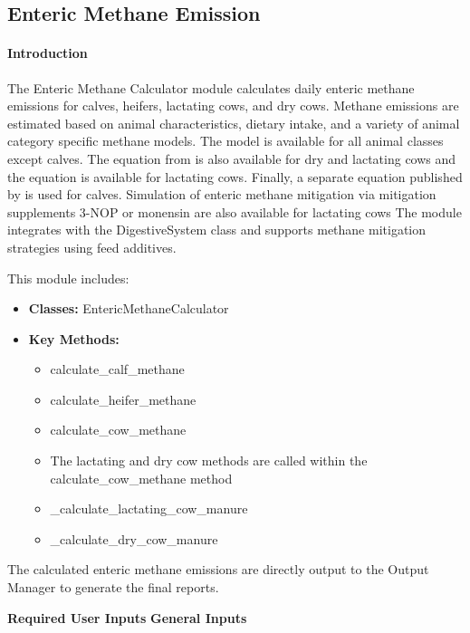 \begin{refsection}
\subsection{Enteric Methane Emission}
 
    \paragraph{Introduction}
    The Enteric Methane Calculator module calculates daily enteric methane emissions for calves, heifers, lactating cows, and dry cows. Methane emissions are estimated based on animal characteristics, dietary intake, and a variety of animal category specific methane models. The \cite{IPCC2006} model is available for all animal classes except calves. The equation from \cite{Mills2003} is also available for dry and lactating cows and the \cite{Niu2018} equation is available for lactating cows. Finally, a separate equation published by \cite{Pattanaik2003} is used for calves. Simulation of enteric methane mitigation via mitigation supplements 3-NOP or monensin are also available for lactating cows The module integrates with the DigestiveSystem class and supports methane mitigation strategies using feed additives.
    
    This module includes:

    \begin{itemize}
        \item \textbf{Classes:} EntericMethaneCalculator
        \item \textbf{Key Methods:}
        \begin{itemize}
            \item calculate\_calf\_methane
            \item calculate\_heifer\_methane
            \item calculate\_cow\_methane
            \item The lactating and dry cow methods are called within the calculate\_cow\_methane method
            \item \_calculate\_lactating\_cow\_manure
            \item \_calculate\_dry\_cow\_manure
        \end{itemize}

    \end{itemize}

The calculated enteric methane emissions are directly output to the Output Manager to generate the final reports. 

\textbf{Required User Inputs}
\textbf{General Inputs}


\end{refsection}
